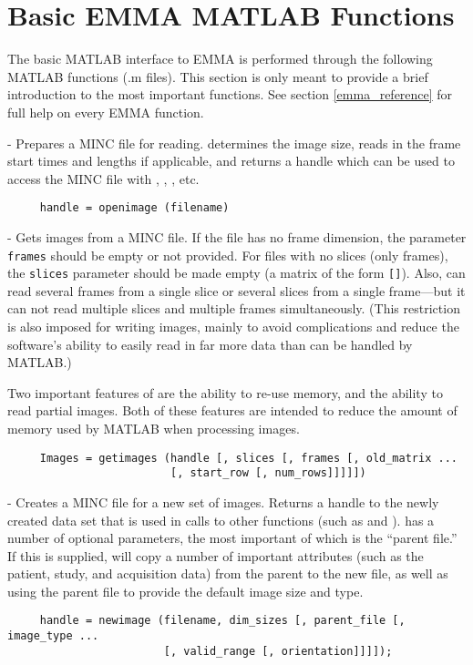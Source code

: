 \newpage
\section{Basic EMMA MATLAB Functions}

The basic MATLAB interface to EMMA is performed through the following
MATLAB functions (.m files).  This section is only meant to provide a
brief introduction to the most important functions.  See section
\ref{emma_reference} for full help on every EMMA function.

\begin{description}

\item {} - Prepares a MINC file for reading.
 determines the image size, reads in the frame start
times and lengths if applicable, and returns a handle which can be
used to access the MINC file with ,
, , etc.
\begin{verbatim}
     handle = openimage (filename)
\end{verbatim}

\item {} - Gets images from a MINC file.  If the file
has no frame dimension, the parameter \verb|frames| should be empty
or not provided.  For files with no slices (only frames), the
\verb|slices| parameter should be made empty (a matrix of the form
\verb|[]|).  Also,  can read several frames from a
single slice or several slices from a single frame---but it can not
read multiple slices and multiple frames simultaneously.  (This
restriction is also imposed for writing images, mainly to avoid
complications and reduce the software's ability to easily read in far
more data than can be handled by MATLAB.)

Two important features of  are the ability to re-use
memory, and the ability to read partial images.  Both of these
features are intended to reduce the amount of memory used by MATLAB
when processing images.
\begin{verbatim}
     Images = getimages (handle [, slices [, frames [, old_matrix ...
                         [, start_row [, num_rows]]]]])
\end{verbatim}

\item {} - Creates a MINC file for a new set of images.
Returns a handle to the newly created data set that is used in calls
to other functions (such as  and ).
 has a number of optional parameters, the most
important of which is the ``parent file.''  If this is supplied,
 will copy a number of important attributes (such as
the patient, study, and acquisition data) from the parent to the new
file, as well as using the parent file to provide the default image
size and type.
\begin{verbatim}
     handle = newimage (filename, dim_sizes [, parent_file [, image_type ...
                        [, valid_range [, orientation]]]]);
\end{verbatim}


\end{description}
